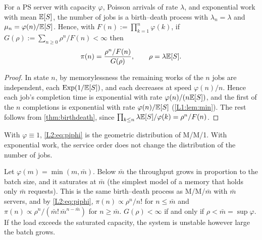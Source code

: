 
\begin{proposition}\label{prop:phi}
For a PS server with capacity $\varphi$, Poisson arrivals of rate $\lambda$, and
exponential work with mean $\mathbb{E}[S]$, the number of jobs is a birth--death process with
$\lambda_n=\lambda$ and $\mu_n=\varphi(n)/\mathbb{E}[S]$. Hence, with
$F(n):=\prod_{k=1}^n\varphi(k)$, if $G(\rho):=\sum_{n\ge0}\rho^n/F(n)<\infty$ then
\begin{equation}\label{L2:eq:piphi}
  \pi(n)=\frac{\rho^n/F(n)}{G(\rho)},\qquad \rho=\lambda\mathbb{E}[S].
\end{equation}
\end{proposition}
\begin{proof}
In state $n$, by memorylessness the remaining works of the $n$ jobs are independent,
each $\mathrm{Exp}(1/\mathbb{E}[S])$, and each decreases at speed $\varphi(n)/n$.
Hence each job's completion time is exponential with rate $\varphi(n)/(n\mathbb{E}[S])$, and the
first of the $n$ completions is exponential with rate $\varphi(n)/\mathbb{E}[S]$
(\cref{L1:lem:min}). The rest follows from \cref{thm:birthdeath}, since
$\prod_{k\le n}\lambda\mathbb{E}[S]/\varphi(k)=\rho^n/F(n)$.
\end{proof}

With $\varphi\equiv1$, \eqref{L2:eq:piphi} is the geometric distribution of M/M/1. With
exponential work, the service order does not change the distribution of the number of
jobs.

\begin{example}\label{L2:ex:sat}
Let $\varphi(m)=\min(m,\bar m)$. Below $\bar m$ the throughput grows in proportion to the batch
size, and it saturates at $\bar m$ (the simplest model of a memory that holds only $\bar m$
requests). This is the same birth--death process as M/M/$\bar m$ with $\bar m$ servers, and by
\eqref{L2:eq:piphi}, $\pi(n)\propto\rho^n/n!$ for $n\le\bar m$ and
$\pi(n)\propto\rho^n/(\bar m!\,\bar m^{n-\bar m})$ for $n\ge\bar m$.
$G(\rho)<\infty$ if and only if $\rho<\bar m=\sup\varphi$. If the load exceeds the saturated
capacity, the system is unstable however large the batch grows.
\end{example}

